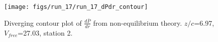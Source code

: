 \begin{figure}[H]
\centering
\texttt{[image: figs/run\_17/run\_17\_dPdr\_contour]}
\caption{Diverging contour plot of $\frac{d\bar{P}}{dr}$ from non-equilibrium theory. $z/c$=6.97, $V_{free}$=27.03, station 2.}
\label{fig:run_17_dPdr_contour}
\end{figure}


